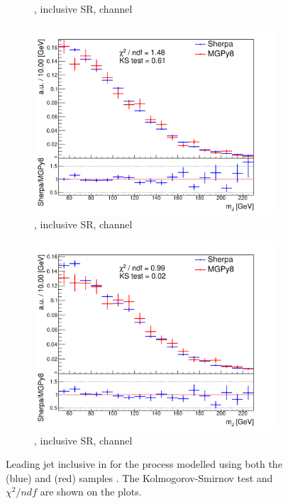 \begin{figure}[!htbp]
\begin{subfigure}{.5\textwidth}
    \caption{\Whf, \pTV inclusive SR, \olep channel}
    \label{fig:Vjets_MGSherpa_inc_sub2}
  \end{subfigure}
  \begin{subfigure}{.5\textwidth}
    \includegraphics[width=\textwidth]{chapters/6.vhbb_boosted/figs/0L_Zhf_2tag1pfat0pjet_ptvinc_SR_noaddbjetsr_mJIncl.pdf}
    \caption{\Zhf, \pTV inclusive SR, \zlep channel}
    \label{fig:Vjets_MGSherpa_inc_sub3}
  \end{subfigure}%
  \hfill
  \begin{subfigure}{.5\textwidth}
    \includegraphics[width=\textwidth]{chapters/6.vhbb_boosted/figs/2L_Zhf_2tag1pfat0pjet_ptvinc_SR_mJIncl.pdf}
    \caption{\Zhf, \pTV inclusive SR, \tlep channel}
    \label{fig:Vjets_MGSherpa_inc_sub4}
  \end{subfigure}%
  \hfill
  \caption{Leading \largeR jet \mJ inclusive in \ptv for the \Vhf process modelled using both the \SHERPA (blue) and \MADGRAPH (red) samples \cite{Dao:2688371}.
  The Kolmogorov-Smirnov test and $\chi^2/ndf$ are shown on the plots.}
  \label{fig:Vjets_MGSherpa_inc}
\end{figure}



